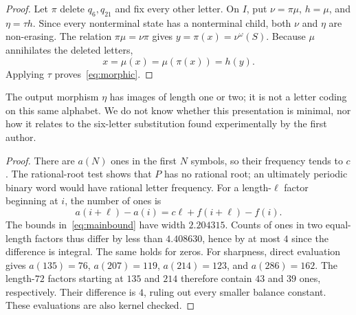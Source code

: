 \documentclass[11pt,a4paper]{article}
\numberwithin{equation}{section}
\newtheorem{proposition}[theorem]{Proposition}
\newtheorem{corollary}[theorem]{Corollary}
\theoremstyle{remark}
\begin{document}
\begin{proof}
Let $\pi$ delete $q_6,q_{21}$ and fix every other letter. On $I$, put
$\nu=\pi\mu$, $h=\mu$, and $\eta=\tau h$.
Since every nonterminal state has a nonterminal child, both $\nu$ and
$\eta$ are non-erasing. The relation $\pi\mu=\nu\pi$ gives
$y=\pi(x)=\nu^\omega(S)$. Because $\mu$ annihilates the deleted letters,
\[
 x=\mu(x)=\mu(\pi(x))=h(y).
\]
Applying $\tau$ proves~\eqref{eq:morphic}.
\end{proof}

The output morphism $\eta$ has images of length one or two; it is not a
letter coding on this same alphabet. We do not know whether this presentation
is minimal, nor how it relates to the six-letter substitution found
experimentally by the first author.

\begin{table}[tb]
\centering\small

\caption{The non-erasing substitution and output morphism in
\cref{prop:morphism}. The initial letter is $S$.}
\label{tab:morphism}
\end{table}

\begin{proof}
There are $a(N)$ ones in the first $N$ symbols, so their frequency tends
to $c$. The rational-root test shows that $P$ has no rational root;
an ultimately periodic binary word would have rational letter frequency.
For a length-$\ell$ factor beginning at $i$, the number of ones is
\[
 a(i+\ell)-a(i)=c\ell+f(i+\ell)-f(i).
\]
The bounds in~\eqref{eq:mainbound} have width $2.204315$. Counts of ones
in two equal-length factors thus differ by less than $4.408630$, hence by
at most $4$ since the difference is integral. The same holds for zeros.
For sharpness, direct evaluation gives
$a(135)=76$, $a(207)=119$, $a(214)=123$, and $a(286)=162$.
The length-$72$ factors starting at $135$ and $214$ therefore contain
$43$ and $39$ ones, respectively. Their difference is $4$, ruling out
every smaller balance constant. These evaluations are also kernel checked.
\end{proof}
\end{document}

